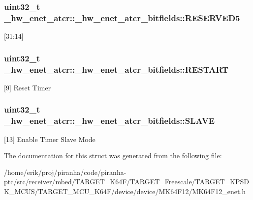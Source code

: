 \subsubsection[{\texorpdfstring{R\+E\+S\+E\+R\+V\+E\+D5}{RESERVED5}}]{\setlength{\rightskip}{0pt plus 5cm}uint32\+\_\+t \+\_\+hw\+\_\+enet\+\_\+atcr\+::\+\_\+hw\+\_\+enet\+\_\+atcr\+\_\+bitfields\+::\+R\+E\+S\+E\+R\+V\+E\+D5}\hypertarget{struct__hw__enet__atcr_1_1__hw__enet__atcr__bitfields_a3da7c88aa97c6bd32772e2c854f42890}{}\label{struct__hw__enet__atcr_1_1__hw__enet__atcr__bitfields_a3da7c88aa97c6bd32772e2c854f42890}
\mbox{[}31\+:14\mbox{]} 
\subsubsection[{\texorpdfstring{R\+E\+S\+T\+A\+RT}{RESTART}}]{\setlength{\rightskip}{0pt plus 5cm}uint32\+\_\+t \+\_\+hw\+\_\+enet\+\_\+atcr\+::\+\_\+hw\+\_\+enet\+\_\+atcr\+\_\+bitfields\+::\+R\+E\+S\+T\+A\+RT}\hypertarget{struct__hw__enet__atcr_1_1__hw__enet__atcr__bitfields_ad61e46f76a1e49e84b897a10fe9319e8}{}\label{struct__hw__enet__atcr_1_1__hw__enet__atcr__bitfields_ad61e46f76a1e49e84b897a10fe9319e8}
\mbox{[}9\mbox{]} Reset Timer 
\subsubsection[{\texorpdfstring{S\+L\+A\+VE}{SLAVE}}]{\setlength{\rightskip}{0pt plus 5cm}uint32\+\_\+t \+\_\+hw\+\_\+enet\+\_\+atcr\+::\+\_\+hw\+\_\+enet\+\_\+atcr\+\_\+bitfields\+::\+S\+L\+A\+VE}\hypertarget{struct__hw__enet__atcr_1_1__hw__enet__atcr__bitfields_aff287ce5cd48f785a20025dc55fcfc02}{}\label{struct__hw__enet__atcr_1_1__hw__enet__atcr__bitfields_aff287ce5cd48f785a20025dc55fcfc02}
\mbox{[}13\mbox{]} Enable Timer Slave Mode 

The documentation for this struct was generated from the following file\+:\begin{DoxyCompactItemize}
\item 
/home/erik/proj/piranha/code/piranha-\/ptc/src/receiver/mbed/\+T\+A\+R\+G\+E\+T\+\_\+\+K64\+F/\+T\+A\+R\+G\+E\+T\+\_\+\+Freescale/\+T\+A\+R\+G\+E\+T\+\_\+\+K\+P\+S\+D\+K\+\_\+\+M\+C\+U\+S/\+T\+A\+R\+G\+E\+T\+\_\+\+M\+C\+U\+\_\+\+K64\+F/device/device/\+M\+K64\+F12/M\+K64\+F12\+\_\+enet.\+h\end{DoxyCompactItemize}
